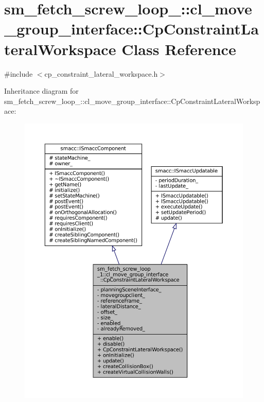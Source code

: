 \hypertarget{classsm__fetch__screw__loop__1_1_1cl__move__group__interface_1_1CpConstraintLateralWorkspace}{}\section{sm\+\_\+fetch\+\_\+screw\+\_\+loop\+\_\+:\+:cl\+\_\+move\+\_\+group\+\_\+interface\+:\+:Cp\+Constraint\+Lateral\+Workspace Class Reference}
\label{classsm__fetch__screw__loop__1_1_1cl__move__group__interface_1_1CpConstraintLateralWorkspace}


{\ttfamily \#include $<$cp\+\_\+constraint\+\_\+lateral\+\_\+workspace.\+h$>$}



Inheritance diagram for sm\+\_\+fetch\+\_\+screw\+\_\+loop\+\_\+:\+:cl\+\_\+move\+\_\+group\+\_\+interface\+:\+:Cp\+Constraint\+Lateral\+Workspace\+:
\nopagebreak
\begin{figure}[H]
\begin{center}
\leavevmode
\includegraphics[width=350pt]{classsm__fetch__screw__loop__1_1_1cl__move__group__interface_1_1CpConstraintLateralWorkspace__inherit__graph}
\end{center}
\end{figure}


